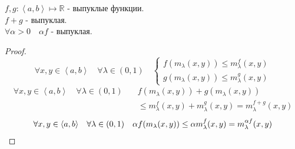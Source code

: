 \documentclass[11pt, oneside]{article}   	%
\begin{document}
\begin{theorem}
    $f, g: \left<a, b\right> \mapsto \mathbb{R}$ -   выпуклые функции.\\
    $f+g$ -  выпуклая.\\
    $\forall{\alpha > 0}\quad \alpha f$ - выпуклая.
    \begin{proof}
        \begin{equation*}
            \forall{x, y\in \left<a, b\right>}\quad \forall{\lambda\in (0, 1)}\quad \begin{cases}
                f(m_{\lambda}(x,y)) \le m_{\lambda}^{f}(x, y)\\
                g(m_{\lambda}(x,y)) \le m_{\lambda}^{g}(x, y)
            \end{cases}
        \end{equation*}
        \begin{equation*}
            \begin{split}        
                \forall{x, y\in \left<a,b\right>}\quad \forall{\lambda\in (0,1)}\quad  &f(m_{\lambda}(x,y)) + g(m_{\lambda}(x,y))\\
                &\le m_{\lambda}^{f}(x,y) + m_{\lambda}^{g}(x, y) = m_{\lambda}^{f+g}(x,y) 
            \end{split}
        \end{equation*}
        \begin{equation*}
            \begin{split}
                \forall{x, y\in \left<a, b\right>}\quad \forall{\lambda\in (0, 1)}\quad \alpha f(m_{\lambda}(x,y)) \le \alpha m_{\lambda}^{f}(x, y) = m_{\lambda}^{\alpha f}(x, y)\qedhere 
            \end{split}
        \end{equation*}
    \end{proof}
\end{theorem}
\end{document}
